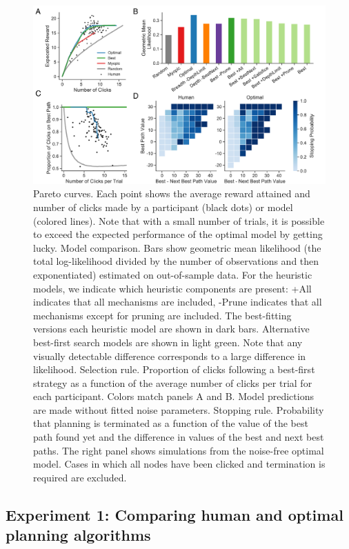 \begin{figure}[t!]
  \centering
  \includegraphics[width=\textwidth]{figs/planning/fig3.pdf}
  \caption{
     Pareto curves. Each point shows the average reward attained and number of clicks made by a participant (black dots) or model (colored lines). Note that with a small number of trials, it is possible to exceed the expected performance of the optimal model by getting lucky.
     Model comparison. Bars show geometric mean likelihood (the total log-likelihood divided by the number of observations and then exponentiated) estimated on out-of-sample data. For the heuristic models, we indicate which heuristic components are present: +All indicates that all mechanisms are included, -Prune indicates that all mechanisms except for pruning are included. The best-fitting versions each heuristic model are shown in dark bars. Alternative best-first search models are shown in light green. Note that any visually detectable difference corresponds to a large difference in likelihood.
     Selection rule. Proportion of clicks following a best-first strategy as a function of the average number of clicks per trial for each participant. Colors match panels A and B. Model predictions are made without fitted noise parameters.
     Stopping rule. Probability that planning is terminated as a function of the value of the best path found yet and the difference in values of the best and next best paths. The right panel shows simulations from the noise-free optimal model. Cases in which all nodes have been clicked and termination is required are excluded.
  }
  \label{fig:planning-exp1}
\end{figure}


\subsection{Experiment 1: Comparing human and optimal planning algorithms}\label{sec:planning-results1}

